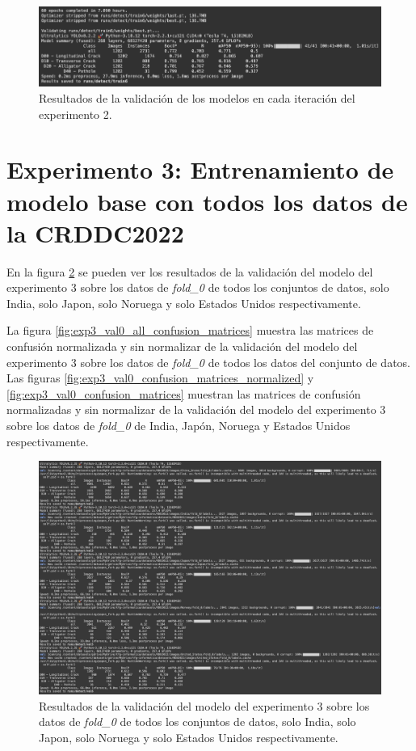 \begin{figure}[H]
    \centering
    \includegraphics[width=\textwidth,height=\textheight,keepaspectratio]{../img/exp2-val-output.png}
    \caption{Resultados de la validación de los modelos en cada iteración del experimento 2.}
    \label{fig:exp2_val_output}
\end{figure}
\newpage


\section{Experimento 3: Entrenamiento de modelo base con todos los datos de la CRDDC2022}
En la figura \ref{fig:exp3_val_output} se pueden ver los resultados de la validación del modelo del experimento 3 sobre los datos de \textit{fold\_0} de todos los conjuntos de datos, solo India, solo Japon, solo Noruega y solo Estados Unidos respectivamente. 

La figura \ref{fig:exp3_val0_all_confusion_matrices} muestra las matrices de confusión normalizada y sin normalizar de la validación del modelo del experimento 3 sobre los datos de \textit{fold\_0} de todos los datos del conjunto de datos. Las figuras \ref{fig:exp3_val0_confusion_matrices_normalized} y \ref{fig:exp3_val0_confusion_matrices} muestran las matrices de confusión normalizadas y sin normalizar de la validación del modelo del experimento 3 sobre los datos de \textit{fold\_0} de India, Japón, Noruega y Estados Unidos respectivamente.

\begin{figure}[H]
    \centering
    \includegraphics[width=\textwidth,height=\textheight,keepaspectratio]{../img/exp3-val-output.png}
    \caption{Resultados de la validación del modelo del experimento 3 sobre los datos de \textit{fold\_0} de todos los conjuntos de datos, solo India, solo Japon, solo Noruega y solo Estados Unidos respectivamente.}
    \label{fig:exp3_val_output}
\end{figure}
\newpage


